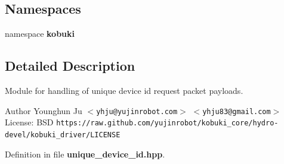 \subsection*{\-Namespaces}
\begin{DoxyCompactItemize}
\item 
namespace {\bf kobuki}
\end{DoxyCompactItemize}


\subsection{\-Detailed \-Description}
\-Module for handling of unique device id request packet payloads. \begin{DoxyAuthor}{\-Author}
\-Younghun \-Ju $<${\tt yhju@yujinrobot.\-com}$>$ $<${\tt yhju83@gmail.\-com}$>$ \-License\-: \-B\-S\-D {\tt https\-://raw.\-github.\-com/yujinrobot/kobuki\-\_\-core/hydro-\/devel/kobuki\-\_\-driver/\-L\-I\-C\-E\-N\-S\-E} 
\end{DoxyAuthor}


\-Definition in file {\bf unique\-\_\-device\-\_\-id.\-hpp}.

